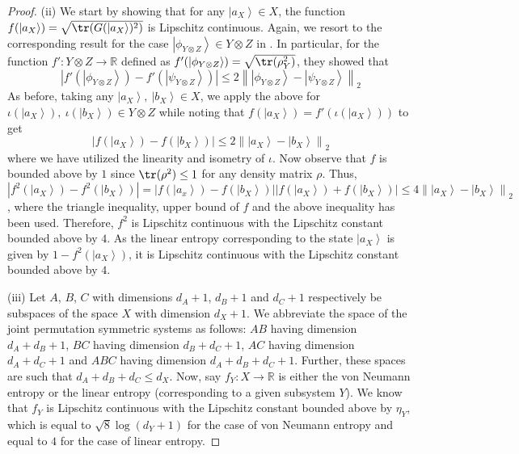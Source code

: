 \documentclass[pre,aps,showpacs,showkeys,twocolumn]{revtex4-1}
\newcommand\norm[1]{\left\lVert#1\right\rVert}
\newcommand\ket[1]{\left|#1\right\rangle}
\theoremstyle{definition}
\theoremstyle{remark}
\begin{document}
\begin{proof}
    (ii) We start by showing that for any $\ket{a_X} \in X$, the function $f(\ket{a_X}) = \sqrt{\tr(G(\ket{a_X})^2)}$ is Lipschitz continuous. Again, we resort to the corresponding result for the case $\ket{\phi_{Y \otimes Z}} \in Y \otimes Z$ in \cite{hayden2006aspects}. In particular, for the function $f' \colon Y \otimes Z \to \mathbb{R}$ defined as $f'(\ket{\phi_{Y \otimes Z}}) = \sqrt{\tr(\rho_Y^2)}$, they showed that
    \begin{equation*}
        |f'(\ket{\phi_{Y \otimes Z}}) - f'(\ket{\psi_{Y \otimes Z}})| \leq 2 \norm{\ket{\phi_{Y \otimes Z}} - \ket{\psi_{Y \otimes Z}}}_2
    \end{equation*}
    As before, taking any $\ket{a_X},\ \ket{b_X} \in X$, we apply the above for $\iota(\ket{a_X}),\ \iota(\ket{b_X}) \in Y \otimes Z$ while noting that $f(\ket{a_X}) = f'(\iota(\ket{a_X}))$ to get
    \begin{equation*}
        |f(\ket{a_X}) - f(\ket{b_X})| \leq 2 \norm{\ket{a_X} - \ket{b_X}}_2
    \end{equation*}
    where we have utilized the linearity and isometry of $\iota$. Now observe that $f$ is bounded above by $1$ since $\tr(\rho^2) \leq 1$ for any density matrix $\rho$. Thus, $|f^2(\ket{a_X}) - f^2(\ket{b_X})| = |f(\ket{a_x}) - f(\ket{b_X})| |f(\ket{a_X}) + f(\ket{b_X})| \leq 4 \norm{\ket{a_X} - \ket{b_X}}_2$, where the triangle inequality, upper bound of $f$ and the above inequality has been used. Therefore, $f^2$ is Lipschitz continuous with the Lipschitz constant bounded above by $4$. As the linear entropy corresponding to the state $\ket{a_X}$ is given by $1 - f^2(\ket{a_X})$, it is Lipschitz continuous with the Lipschitz constant bounded above by $4$.
    \newline

    (iii) Let $A$, $B$, $C$ with dimensions $d_A + 1$, $d_B + 1$ and $d_C + 1$ respectively be subspaces of the space $X$ with dimension $d_X + 1$. We abbreviate the space of the joint permutation symmetric systems as follows: $AB$ having dimension $d_A + d_B + 1$, $BC$ having dimension $d_B + d_C + 1$, $AC$ having dimension $d_A + d_C + 1$ and $ABC$ having dimension $d_A + d_B + d_C + 1$. Further, these spaces are such that $d_A + d_B + d_C \leq d_X$. Now, say $f_Y\colon X \to \mathbb{R}$ is either the von Neumann entropy or the linear entropy (corresponding to a given subsystem $Y$). We know that $f_Y$ is Lipschitz continuous with the Lipschitz constant bounded above by $\eta_Y$, which is equal to $\sqrt{8} \log(d_Y + 1)$ for the case of von Neumann entropy and equal to $4$ for the case of linear entropy.


\end{proof}
\end{document}
